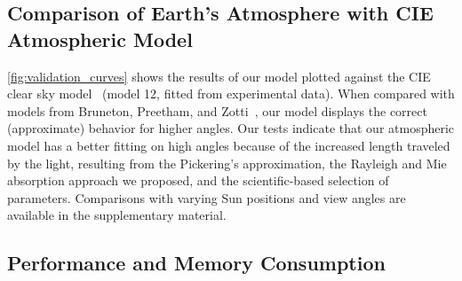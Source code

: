 \documentclass[journal]{vgtc}                %
\newcommand{\joncomment}[1]{\textbf{[JC~} \textcolor{red}{#1} \textbf{~]}}
\newcommand{\review}[1]{{\color{blue}#1}}
\begin{document}
\subsection{Comparison of Earth's Atmosphere with CIE Atmospheric Model}\label{sec:cie_model}

\autoref{fig:validation_curves} shows the results of our model plotted against the CIE clear sky model~\cite{Darula:2002} (model 12, fitted from experimental data). When compared with models from Bruneton, Preetham, and Zotti~\cite{BrunetonNeyret:2008, Preetham:1999, Zotti:2007}, our model displays the correct (approximate) behavior for higher angles. \review{%
Our tests indicate that our atmospheric model has a better fitting on high angles because of the increased length traveled by the light, resulting from the Pickering's approximation, the Rayleigh and Mie absorption approach we proposed, and the scientific-based selection of parameters.} Comparisons with varying Sun positions and view angles are available in the \review{supplementary material}.







\vspace*{-1mm}
\subsection{Performance and Memory Consumption}

\end{document}
